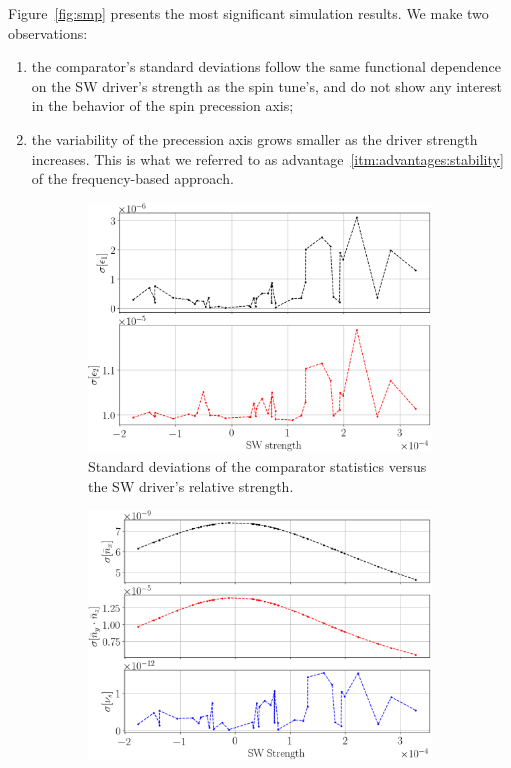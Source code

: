 \documentclass[preprint, review]{elsarticle}
\begin{document}
Figure~\ref{fig:smp} presents the most significant simulation results. We make two observations:
\begin{enumerate}[(1)]
\item the comparator's standard deviations follow the same functional dependence on the SW driver's
  strength as the spin tune's, and do not show any interest in the behavior of the spin precession axis;
\item the variability of the precession axis grows smaller as the driver strength increases. This is
  what we referred to as advantage~\ref{itm:advantages:stability} of the frequency-based approach.
\end{enumerate}

\begin{figure}[h]\centering
  \begin{subfigure}{\linewidth}
    \includegraphics[width=\linewidth]{img/smp_sim/residual_SD_vs_SW(both)}
    \caption{Standard deviations of the comparator statistics versus the SW driver's
    relative strength.\label{fig:smp:resid}}
  \end{subfigure} 
  \begin{subfigure}{\linewidth}
    \includegraphics[width=\linewidth]{img/smp_sim/NBAR_variation_sd_vs_SW}

\end{subfigure}
\end{figure}
\end{document}
